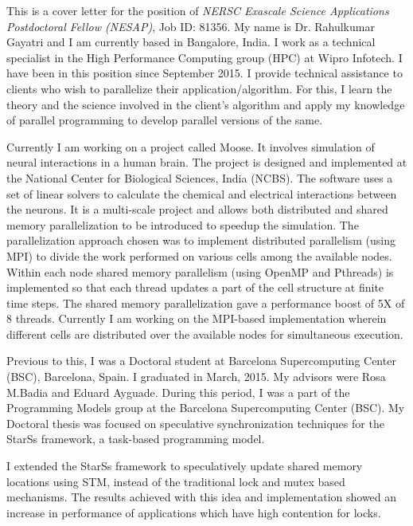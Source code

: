 \documentclass[10pt,stdletter,dateno]{newlfm}
\begin{document}
\begin{newlfm}
	   This is a cover letter for the position of {\it NERSC Exascale Science Applications Postdoctoral Fellow (NESAP)}, Job ID: 81356. 
	   My name is Dr. Rahulkumar Gayatri and I am currently based in Bangalore, India. 
	   I work as a technical specialist in the High Performance Computing group (HPC) at Wipro Infotech. 
	   I have been in this position since September 2015. 
	   I provide technical assistance to clients who wish to parallelize their application/algorithm.
	   For this, I learn the theory and the science involved in the client's algorithm and apply my knowledge of parallel programming to develop parallel versions of the same.
%	   
	   \par
	   Currently I am working on a project called Moose. It involves simulation of neural interactions in a human brain. 
	   The project is designed and implemented at the National Center for Biological Sciences, India (NCBS). 
	   The software uses a set of linear solvers to calculate the chemical and electrical interactions between the neurons. 
	   It is a multi-scale project and allows both distributed and shared memory parallelization to be introduced to speedup the simulation. 
	   The parallelization approach chosen was to implement distributed parallelism (using MPI) to divide the work performed on various cells among the available nodes. 
	   Within each node shared memory parallelism (using OpenMP and Pthreads) is implemented so that each thread updates a part of the cell structure at finite time steps.
	   The shared memory parallelization gave a performance boost of 5X of 8 threads. 
	   Currently I am working on the MPI-based implementation wherein different cells are distributed over the available nodes for simultaneous execution. 
%	   
	   \par
	   Previous to this, I was a Doctoral student at Barcelona Supercomputing Center (BSC), Barcelona, Spain. I graduated in March, 2015. 
	   My advisors were Rosa M.Badia and Eduard Ayguade.  
	   During this period, I was a part of the Programming Models group at the Barcelona Supercomputing Center (BSC). 
	   My Doctoral thesis was focused on speculative synchronization techniques for the StarSs framework, a task-based programming model.
%
	   \par
	   I extended the StarSs framework to speculatively update shared memory locations using STM, instead of the traditional lock and mutex based mechanisms.
	   The results achieved with this idea and implementation showed an increase in performance of applications which have high contention for locks. 

\end{newlfm}
\end{document}
